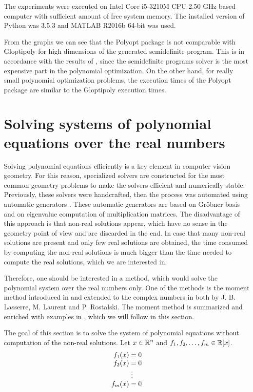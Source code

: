 The experiments were executed on Intel Core i5-3210M CPU 2.50 GHz based computer with sufficient amount of free system memory.
The installed version of Python was 3.5.3 and MATLAB R2016b 64-bit was used.

From the graphs we can see that the Polyopt package is not comparable with Gloptipoly for high dimensions of the generated semidefinite program. This is in accordance with the results of , since the semidefinite programs solver is the most expensive part in the polynomial optimization.
On the other hand, for really small polynomial optimization problems, the execution times of the Polyopt package are  similar to the Gloptipoly execution times.


\section{Solving systems of polynomial equations over the real numbers}
Solving polynomial equations efficiently is a key element in computer vision geometry.
For this reason, specialized solvers are constructed for the most common geometry problems to make the solvers efficient and numerically stable.
Previously, these solvers were handcrafted, then the process was automated using automatic generators \cite{autogen}.
These automatic generators are based on Gr\"obner basis \cite{Becker93} and on eigenvalue computation of multiplication matrices.
The disadvantage of this approach is that non-real solutions appear, which  have no sense in the geometry point of view and are discarded in the end.
In case that many non-real solutions are present and only few real solutions are obtained, the time consumed by computing the non-real solutions is much bigger than the time needed to compute the real solutions, which we are interested in.

Therefore, one should be interested in a method, which would solve the polynomial system over the real numbers only.
One of the methods is the moment method introduced in \cite{momentMethodReal} and extended to the complex numbers in \cite{momentMethodComplex} both by J. B. Lasserre, M. Laurent and P. Rostalski.
The moment method is summarized and enriched with examples in \cite{momentMethod}, which we will follow in this section.

The goal of this section is to solve the system of polynomial equations  without computation of the non-real solutions.
Let $x\in\mathbb{R}^n$ and $f_1,f_2,\ldots,f_m\in\mathbb{R}[x]$.
\begin{align}
  \arraycolsep=1.4pt
  \begin{array}{rl}
    f_1(x) &= 0\\
    f_2(x) &= 0\\
    &\vdots\\
    f_m(x) &= 0
  \end{array}\labeleq{POP:sol:system}
\end{align}

